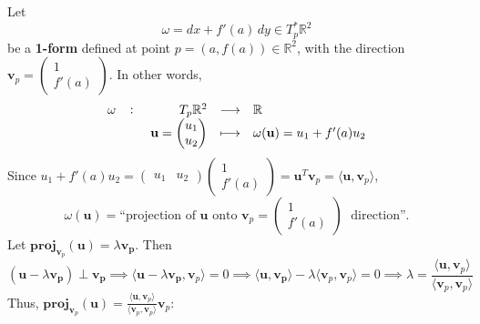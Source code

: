 \documentclass[11pt,openany]{article}
\renewcommand{\vec}[1]{\mathbf{#1}}
\begin{document}
\newpage\noindent
Let
$$
\boxed{
	\omega = dx + f'(a)\,dy \in T_p^*\mathbb{R}^2}
$$ be a \textbf{1-form} defined at point $p = (a, f(a)) \in \mathbb{R}^2$, with the direction $\vec{v}_p = \begin{pmatrix} 1 \\ f'(a) \end{pmatrix}$. 
In other words, 
\[
\fullfunction{\omega}{T_p\R^2}{\R}{\vec{u} = \begin{pmatrix} u_1 \\ u_2 \end{pmatrix}}{\omega(\vec{u}) = u_1 + f'(a)u_2}
\]
Since $u_1+f'(a)u_2=\begin{pmatrix}
	u_1 & u_2
\end{pmatrix}\begin{pmatrix}
	1\\ f'(a)
\end{pmatrix}=\vec{u}^T\vec{v}_p=\langle\vec{u},\vec{v}_p\rangle$,
$$
\boxed{
	\omega(\vec{u}) = \text{“projection of } \vec{u} \text{ onto } \vec{v}_p = \begin{pmatrix}
		1\\ f'(a)
	\end{pmatrix}\; \text{ direction”}.
}
$$
Let $\vec{proj}_{\vec{v}_p}(\vec{u})=\lambda\vec{v_p}$. Then\[
(\vec{u}-\lambda\vec{v_p})\perp\vec{v_p}\implies\langle\vec{u}-\lambda\vec{v_p},\vec{v}_p\rangle=0\implies\langle\vec{u},\vec{v_p}\rangle-\lambda\langle\vec{v}_p,\vec{v}_p\rangle=0\implies\lambda=\frac{\langle\vec{u},\vec{v}_p\rangle}{\langle\vec{v}_p,\vec{v}_p\rangle}
\] Thus, $\displaystyle\vec{proj}_{\vec{v}_p}(\vec{u})=\frac{\langle\vec{u},\vec{v}_p\rangle}{\langle\vec{v}_p,\vec{v}_p\rangle}\vec{v}_p$:
%
%
%
%
%
%
%
%
%
%
%
%
%
%
%
%
%
\end{document}
